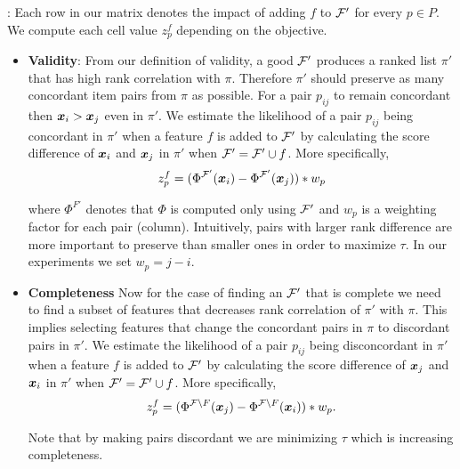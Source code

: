 : Each row in our matrix denotes the impact of adding $f$ to $\mathcal{F}'$ for every $p \in P$. We compute each cell value $z^{f}_{p}$ depending on the objective.

\begin{itemize}
    \item \textbf{Validity}: From our definition of validity, a good $\mathcal{F}'$ produces a ranked list $\pi'$ that has high rank correlation with $\pi$. Therefore $\pi'$ should preserve as many concordant item pairs from $\pi$ as possible. For a pair $p_{ij}$ to remain concordant then $\boldsymbol{x}_i > \boldsymbol{x}_j$ even in $\pi'$. We estimate the likelihood of a pair  $p_{ij}$ being concordant in $\pi'$ when a feature $f$ is added to $\mathcal{F}'$ by calculating the score difference of $\boldsymbol{x}_i$ and $\boldsymbol{x}_j$ in $\pi'$ when $\mathcal{F}' = \mathcal{F}' \cup f$. More specifically, 
    \begin{equation}
        z^{f}_{p} = (\Phi^{\mathcal{F}'}( \boldsymbol{x}_{i}) - \Phi^{\mathcal{F}'}(\boldsymbol{x}_{j})) * w_p
    \end{equation}
    
    where $\Phi^{F'}$ denotes that $\Phi$  is computed only using $\mathcal{F}'$ and $w_p$ is a weighting factor for each pair (column). Intuitively, pairs with larger rank difference are more important to preserve than smaller ones in order to maximize $\tau$. In our experiments we set $w_p = j-i$.


    
    \item  \textbf{Completeness} Now for the case of finding an $\mathcal{F}'$ that is complete we need to find a subset of features that decreases rank correlation of $\pi'$ with $\pi$. This implies selecting features that change the concordant pairs in $\pi$ to discordant pairs in $\pi'$. We estimate the likelihood of a pair $p_{ij}$ being disconcordant in $\pi'$ when a feature $f$ is added to $\mathcal{F}'$ by calculating the score difference of $\boldsymbol{x}_j$ and $\boldsymbol{x}_i$ in $\pi'$ when $\mathcal{F}' = \mathcal{F}' \cup f$. More specifically, 
    \begin{equation}
        z^{f}_{p} = (\Phi^{\mathcal{F}\setminus F}(\boldsymbol{x}_{j}) - \Phi^{\mathcal{F}\setminus F}(\boldsymbol{x}_{i})) * w_p.
    \end{equation}
    
    Note that by making pairs discordant we are minimizing $\tau$ which is increasing completeness. 
\end{itemize}

